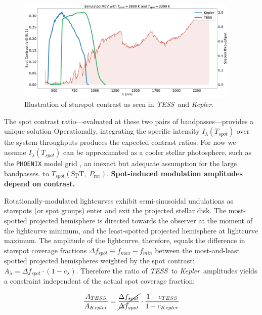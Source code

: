 \documentclass[letterpaper,12pt]{article}
\newcommand{\tess}{{\it TESS}}
\newcommand{\kepler}{{\it Kepler}}
\begin{document}
\begin{figure}[hbt!]
    \includegraphics[width=0.95\textwidth]{figures/contrast_spectrum.pdf}
    \caption{Illustration of starspot contrast as seen in \tess\ and \kepler. }
    \label{fig:filtercurve}
\end{figure}



The spot contrast ratio---evaluated at these two pairs of bandpasses---provides a unique solution Operationally, integrating the specific intensity $I_\lambda(T_{spot})$ over the system throughputs produces the expected contrast ratios.  For now we assume $I_\lambda(T_{spot})$ can be approximated as a cooler stellar photosphere, such as the \texttt{PHOENIX} model grid \cite{2013A&A...553A...6H}, an inexact but adequate assumption for the large bandpasses. to $T_{spot}(\mathrm{SpT},\;P_{\mathrm{rot}})$.  \newline \newline
\textbf{Spot-induced modulation amplitudes depend on contrast.}

 

Rotationally-modulated lightcurves exhibit semi-sinusoidal undulations as starspots (or spot groups) enter and exit the projected stellar disk.  The most-spotted projected hemisphere is directed towards the observer at the moment of the lightcurve minimum, and the least-spotted projected hemisphere at lightcurve maximum.  The amplitude of the lightcurve, therefore, equals the difference in starspot coverage fractions $\Delta f_{spot} \equiv f_{max}-f_{min}$ between the most-and-least spotted projected hemispheres weighted by the spot contrast: $ A_\lambda = \Delta f_{spot} \cdot (1-c_\lambda)$.  Therefore the ratio of \tess\ to \kepler\ amplitudes yields a constraint independent of the actual spot coverage fraction:

$$ \frac{A_{TESS}}{A_{Kepler}} = \cancel{\frac{\Delta f_{spot}}{\Delta f_{spot}}} \cdot \frac{1-c_{TESS}}{1-c_{Kepler}} $$
\end{document}
